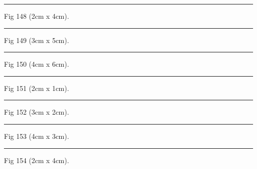 \documentclass[a4paper,11pt]{article}
\begin{document}
\begin{swarmwrap}%
  \begin{minipage}[t]{2cm}
    \centering
    \rule{\linewidth}{4cm}
    {\footnotesize Fig 148 (2cm x 4cm).}
  \end{minipage}%
\end{swarmwrap}%
\swarmwrapnext
\lipsum[148]%

\begin{swarmwrap}%
  \begin{minipage}[t]{3cm}
    \centering
    \rule{\linewidth}{5cm}
    {\footnotesize Fig 149 (3cm x 5cm).}
  \end{minipage}%
\end{swarmwrap}%
\swarmwrapnext
\lipsum[149]%

\begin{swarmwrap}%
  \begin{minipage}[t]{4cm}
    \centering
    \rule{\linewidth}{6cm}
    {\footnotesize Fig 150 (4cm x 6cm).}
  \end{minipage}%
\end{swarmwrap}%
\swarmwrapnext
\lipsum[150]%

\begin{swarmwrap}%
  \begin{minipage}[t]{2cm}
    \centering
    \rule{\linewidth}{1cm}
    {\footnotesize Fig 151 (2cm x 1cm).}
  \end{minipage}%
\end{swarmwrap}%
\swarmwrapnext
\lipsum[1]%

\begin{swarmwrap}%
  \begin{minipage}[t]{3cm}
    \centering
    \rule{\linewidth}{2cm}
    {\footnotesize Fig 152 (3cm x 2cm).}
  \end{minipage}%
\end{swarmwrap}%
\swarmwrapnext
\lipsum[2]%

\begin{swarmwrap}%
  \begin{minipage}[t]{4cm}
    \centering
    \rule{\linewidth}{3cm}
    {\footnotesize Fig 153 (4cm x 3cm).}
  \end{minipage}%
\end{swarmwrap}%
\swarmwrapnext
\lipsum[3]%

\begin{swarmwrap}%
  \begin{minipage}[t]{2cm}
    \centering
    \rule{\linewidth}{4cm}
    {\footnotesize Fig 154 (2cm x 4cm).}
  \end{minipage}%
\end{swarmwrap}%
\swarmwrapnext
\lipsum[4]%
\end{document}
